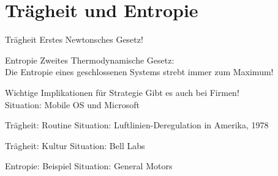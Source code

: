 \section{Trägheit und Entropie}


\begin{frame}[c]{Trägheit}
    \Large
    Erstes Newtonsches Gesetz!
\end{frame}


\begin{frame}[c]{Entropie}
    \Large
    Zweites Thermodynamische Gesetz: \\
    Die Entropie eines geschlossenen Systems strebt immer zum Maximum!
\end{frame}


\begin{frame}[c]{Wichtige Implikationen für Strategie}
    \Large
    Gibt es auch bei Firmen! \\ \pause
    Situation: Mobile OS und Microsoft \\ \pause

\end{frame}


\begin{frame}[c]{Trägheit: Routine}
    \Large
    Situation: Luftlinien-Deregulation in Amerika, 1978
\end{frame}


\begin{frame}[c]{Trägheit: Kultur}
    \Large
    Situation: Bell Labs
\end{frame}


\begin{frame}[c]{Entropie: Beispiel}
    Situation: General Motors
\end{frame}


